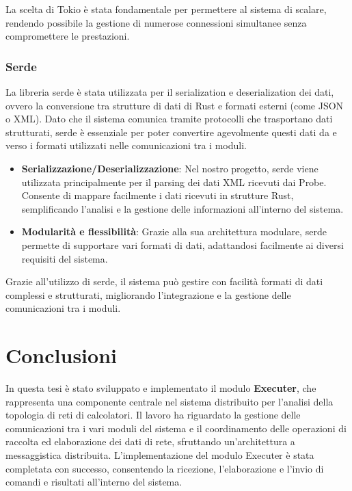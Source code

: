 \documentclass[target=bach,aauheader=,style=]{thud}
\begin{document}
La scelta di Tokio è stata fondamentale per permettere al sistema di scalare, rendendo possibile la gestione di numerose connessioni simultanee senza compromettere le prestazioni.

\subsection{Serde}
La libreria serde \cite{rust_serde} è stata utilizzata per il serialization e deserialization dei dati, ovvero la conversione tra strutture di dati di Rust e formati esterni (come JSON o XML). Dato che il sistema comunica tramite protocolli che trasportano dati strutturati, serde è essenziale per poter convertire agevolmente questi dati da e verso i formati utilizzati nelle comunicazioni tra i moduli.
\begin{itemize}
  \item \textbf{Serializzazione/Deserializzazione}: Nel nostro progetto, serde viene utilizzata principalmente per il parsing dei dati XML ricevuti dai Probe. Consente di mappare facilmente i dati ricevuti in strutture Rust, semplificando l'analisi e la gestione delle informazioni all'interno del sistema.
  \item \textbf{Modularità e flessibilità}: Grazie alla sua architettura modulare, serde permette di supportare vari formati di dati, adattandosi facilmente ai diversi requisiti del sistema.
\end{itemize}

Grazie all'utilizzo di serde, il sistema può gestire con facilità formati di dati complessi e strutturati, migliorando l'integrazione e la gestione delle comunicazioni tra i moduli.



\chapter{Conclusioni}
In questa tesi è stato sviluppato e implementato il modulo \textbf{Executer}, che rappresenta una componente centrale nel sistema distribuito per l'analisi della topologia di reti di calcolatori. Il lavoro ha riguardato la gestione delle comunicazioni tra i vari moduli del sistema e il coordinamento delle operazioni di raccolta ed elaborazione dei dati di rete, sfruttando un'architettura a messaggistica distribuita. L'implementazione del modulo Executer è stata completata con successo, consentendo la ricezione, l'elaborazione e l'invio di comandi e risultati all'interno del sistema.
\end{document}
